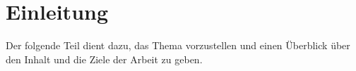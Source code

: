 \chapter{Einleitung} %
\label{sec:Einleitung}

Der folgende Teil dient dazu, das Thema vorzustellen und einen Überblick über den Inhalt und die Ziele der Arbeit zu geben. 

% 

